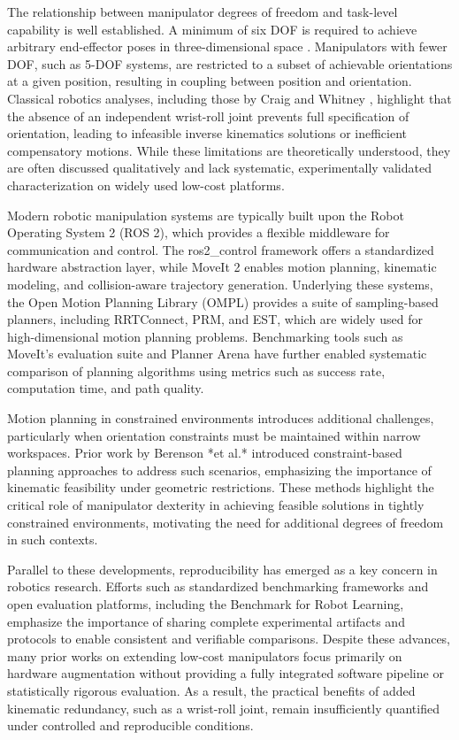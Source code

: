 \documentclass[conference]{IEEEtran}
\begin{document}
		The relationship between manipulator degrees of freedom and task-level capability is well established. A minimum of six DOF is required to achieve arbitrary end-effector poses in three-dimensional space . Manipulators with fewer DOF, such as 5-DOF systems, are restricted to a subset of achievable orientations at a given position, resulting in coupling between position and orientation. Classical robotics analyses, including those by Craig and Whitney , highlight that the absence of an independent wrist-roll joint prevents full specification of orientation, leading to infeasible inverse kinematics solutions or inefficient compensatory motions. While these limitations are theoretically understood, they are often discussed qualitatively and lack systematic, experimentally validated characterization on widely used low-cost platforms.
		
		Modern robotic manipulation systems are typically built upon the Robot Operating System 2 (ROS 2), which provides a flexible middleware for communication and control. The ros2\_control framework offers a standardized hardware abstraction layer, while MoveIt 2 enables motion planning, kinematic modeling, and collision-aware trajectory generation. Underlying these systems, the Open Motion Planning Library (OMPL) provides a suite of sampling-based planners, including RRTConnect, PRM, and EST, which are widely used for high-dimensional motion planning problems. Benchmarking tools such as MoveIt’s evaluation suite and Planner Arena have further enabled systematic comparison of planning algorithms using metrics such as success rate, computation time, and path quality.
		
		Motion planning in constrained environments introduces additional challenges, particularly when orientation constraints must be maintained within narrow workspaces. Prior work by Berenson *et al.* introduced constraint-based planning approaches to address such scenarios, emphasizing the importance of kinematic feasibility under geometric restrictions. These methods highlight the critical role of manipulator dexterity in achieving feasible solutions in tightly constrained environments, motivating the need for additional degrees of freedom in such contexts.
		
		Parallel to these developments, reproducibility has emerged as a key concern in robotics research. Efforts such as standardized benchmarking frameworks and open evaluation platforms, including the Benchmark for Robot Learning, emphasize the importance of sharing complete experimental artifacts and protocols to enable consistent and verifiable comparisons. Despite these advances, many prior works on extending low-cost manipulators focus primarily on hardware augmentation without providing a fully integrated software pipeline or statistically rigorous evaluation. As a result, the practical benefits of added kinematic redundancy, such as a wrist-roll joint, remain insufficiently quantified under controlled and reproducible conditions.
		
\end{document}
